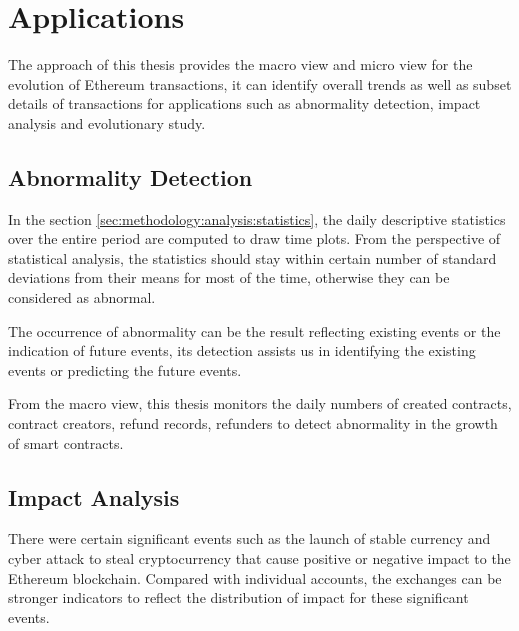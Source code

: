 %
\chapter{Applications}
\label{sec:applications}



The approach of this thesis provides the macro view and micro view for the evolution of Ethereum transactions, it can identify overall trends as well as subset details of transactions for applications such as abnormality detection, impact analysis and evolutionary study.

\section{Abnormality Detection}
\label{sec:applications:abnormality}

In the section \ref{sec:methodology:analysis:statistics}, the daily descriptive statistics over the entire period are computed to draw time plots. From the perspective of statistical analysis, the statistics should stay within certain number of standard deviations from their means for most of the time, otherwise they can be considered as abnormal.

The occurrence of abnormality can be the result reflecting existing events or the indication of future events, its detection assists us in identifying the existing events or predicting the future events.

From the macro view, this thesis monitors the daily numbers of created contracts, contract creators, refund records, refunders to detect abnormality in the growth of smart contracts.

\section{Impact Analysis}
\label{sec:applications:impact}

There were certain significant events such as the launch of stable currency and cyber attack to steal cryptocurrency that cause positive or negative impact to the Ethereum blockchain. Compared with individual accounts, the exchanges can be stronger indicators to reflect the distribution of impact for these significant events. 

